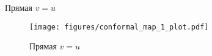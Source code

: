 \begin{frame}{Прямая \(v = u\)}
	\begin{figure}
		\centering
		\texttt{[image: figures/conformal\_map\_1\_plot.pdf]}
		\caption{Прямая \(v=u\)}\label{fig:conformal_1}
	\end{figure}
\end{frame}
